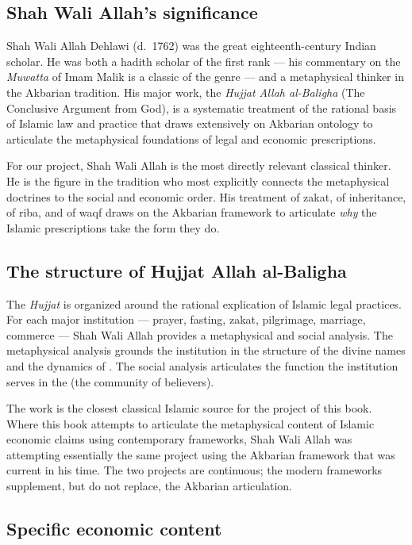 \subsection{Shah Wali Allah's significance}

Shah Wali Allah Dehlawi (d.~1762) was the great eighteenth-century
Indian scholar. He was both a hadith scholar of the first rank ---
his commentary on the \textit{Muwatta} of Imam Malik is a classic
of the genre --- and a metaphysical thinker in the Akbarian
tradition. His major work, the \textit{Hujjat Allah al-Baligha}
(The Conclusive Argument from God), is a systematic treatment of
the rational basis of Islamic law and practice that draws extensively
on Akbarian ontology to articulate the metaphysical foundations of
legal and economic prescriptions.

For our project, Shah Wali Allah is the most directly relevant
classical thinker. He is the figure in the tradition who most
explicitly connects the metaphysical doctrines to the social and
economic order. His treatment of zakat, of inheritance, of riba,
and of waqf draws on the Akbarian framework to articulate
\emph{why} the Islamic prescriptions take the form they do.

\subsection{The structure of Hujjat Allah al-Baligha}

The \textit{Hujjat} is organized around the rational explication of
Islamic legal practices. For each major institution --- prayer,
fasting, zakat, pilgrimage, marriage, commerce --- Shah Wali Allah
provides a metaphysical and social analysis. The metaphysical
analysis grounds the institution in the structure of the divine
names and the dynamics of . The social analysis
articulates the function the institution serves in the
 (the community of believers).

The work is the closest classical Islamic source for the project of
this book. Where this book attempts to articulate the metaphysical
content of Islamic economic claims using contemporary frameworks,
Shah Wali Allah was attempting essentially the same project using
the Akbarian framework that was current in his time. The two
projects are continuous; the modern frameworks supplement, but do
not replace, the Akbarian articulation.

\subsection{Specific economic content}

